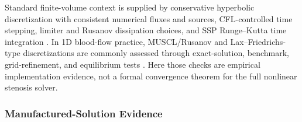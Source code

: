 \begin{table}[!htb]
    \centering
    \scriptsize
    \caption{Synthetic verification check for the specified cross-section
    quadrature operator. Differences are measured against analytic constant or
    affine references on the synthetic tetrahedron; the
    plane-shift rows report changes relative to the $z=0.5$ affine cut.}
    \label{tab:t1-cross-section-operator-validation}
\end{table}

Standard finite-volume context is supplied by conservative hyperbolic
discretization with consistent numerical fluxes and sources, CFL-controlled time
stepping, limiter and Rusanov dissipation choices, and SSP Runge--Kutta time
integration \cite{LeVeque2002FiniteVolumeMethodsForHyperbolicProblems}. In 1D
blood-flow practice, MUSCL/Rusanov and Lax--Friedrichs-type discretizations are
commonly assessed through exact-solution, benchmark, grid-refinement, and
equilibrium tests
\cite{Wang2014BloodFlowNetworks,BeckersKolbe2025LaxFriedrichsHemodynamics,BoileauEtAl2015Benchmark,BenemeritoEtAl2024OpenBF,LuccaEtAl2025FFRPrediction}.
Here those checks are empirical implementation evidence, not a formal
convergence theorem for the full nonlinear stenosis solver.

\subsubsection{Manufactured-Solution Evidence}
\label{subsec:mms-verification}

